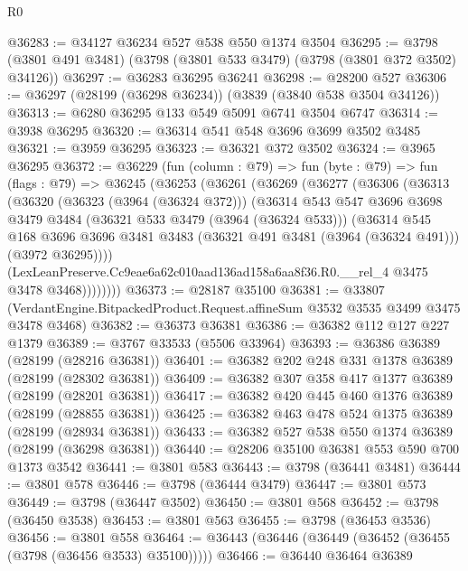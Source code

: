\begin{lexlean}{R0}
\begin{coremodule}
@36283 := @34127 @36234 @527 @538 @550 @1374 @3504
@36295 := @3798 (@3801 @491 @3481) (@3798 (@3801 @533 @3479) (@3798 (@3801 @372 @3502) @34126))
@36297 := @36283 @36295 @36241
@36298 := @28200 @527
@36306 := @36297 (@28199 (@36298 @36234)) (@3839 (@3840 @538 @3504 @34126))
@36313 := @6280 @36295 @133 @549 @5091 @6741 @3504 @6747
@36314 := @3938 @36295
@36320 := @36314 @541 @548 @3696 @3699 @3502 @3485
@36321 := @3959 @36295
@36323 := @36321 @372 @3502
@36324 := @3965 @36295
@36372 := @36229
    (fun (column : @79) =>
    fun (byte : @79) =>
    fun (flags : @79) =>
    @36245
      (@36253
        (@36261
          (@36269
            (@36277
              (@36306
                (@36313
                  (@36320
                    (@36323 (@3964 (@36324 @372)))
                    (@36314
                      @543
                      @547
                      @3696
                      @3698
                      @3479
                      @3484
                      (@36321 @533 @3479 (@3964 (@36324 @533)))
                      (@36314
                        @545
                        @168
                        @3696
                        @3696
                        @3481
                        @3483
                        (@36321 @491 @3481 (@3964 (@36324 @491)))
                        (@3972 @36295))))
                  (LexLeanPreserve.Cc9eae6a62c010aad136ad158a6aa8f36.R0.__rel_4
                    @3475
                    @3478
                    @3468))))))))
@36373 := @28187 @35100
@36381 := @33807
    (VerdantEngine.BitpackedProduct.Request.affineSum @3532 @3535 @3499 @3475 @3478 @3468)
@36382 := @36373 @36381
@36386 := @36382 @112 @127 @227 @1379
@36389 := @3767 @33533 (@5506 @33964)
@36393 := @36386 @36389 (@28199 (@28216 @36381))
@36401 := @36382 @202 @248 @331 @1378 @36389 (@28199 (@28302 @36381))
@36409 := @36382 @307 @358 @417 @1377 @36389 (@28199 (@28201 @36381))
@36417 := @36382 @420 @445 @460 @1376 @36389 (@28199 (@28855 @36381))
@36425 := @36382 @463 @478 @524 @1375 @36389 (@28199 (@28934 @36381))
@36433 := @36382 @527 @538 @550 @1374 @36389 (@28199 (@36298 @36381))
@36440 := @28206 @35100 @36381 @553 @590 @700 @1373 @3542
@36441 := @3801 @583
@36443 := @3798 (@36441 @3481)
@36444 := @3801 @578
@36446 := @3798 (@36444 @3479)
@36447 := @3801 @573
@36449 := @3798 (@36447 @3502)
@36450 := @3801 @568
@36452 := @3798 (@36450 @3538)
@36453 := @3801 @563
@36455 := @3798 (@36453 @3536)
@36456 := @3801 @558
@36464 := @36443 (@36446 (@36449 (@36452 (@36455 (@3798 (@36456 @3533) @35100)))))
@36466 := @36440 @36464 @36389

\end{coremodule}
\end{lexlean}
